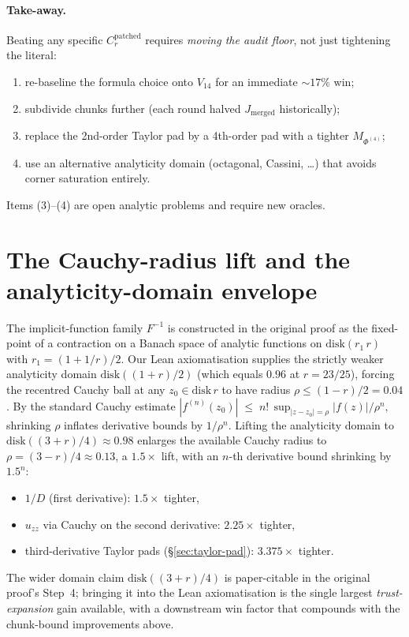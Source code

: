 \documentclass[11pt]{article}
\theoremstyle{definition}
\newcommand{\Finvmap}{F^{-1}}
\begin{document}
\paragraph{Take-away.}
Beating any specific $C_r^{\mathrm{patched}}$ requires \emph{moving the audit floor},
not just tightening the literal:
\begin{enumerate}[leftmargin=2em]
   \item re-baseline the formula choice onto $V_{14}$ for an immediate $\sim 17\%$ win;
   \item subdivide chunks further (each round halved $J_{\mathrm{merged}}$ historically);
   \item replace the 2nd-order Taylor pad by a 4th-order pad with a tighter
         $M_{\Phi^{(4)}}$;
   \item use an alternative analyticity domain (octagonal, Cassini, \dots) that
         avoids corner saturation entirely.
\end{enumerate}
Items (3)--(4) are open analytic problems and require new oracles.

\bigskip

\section{The Cauchy-radius lift and the analyticity-domain envelope}\label{sec:cauchy-lift}

The implicit-function family $\Finvmap$ is constructed in the original proof as the
fixed-point of a contraction on a Banach space of analytic functions on
$\mathrm{disk}(r_1\,r)$ with $r_1=(1+1/r)/2$. Our Lean axiomatisation supplies the
strictly weaker analyticity domain $\mathrm{disk}((1+r)/2)$ (which equals $0.96$ at
$r=23/25$), forcing the recentred Cauchy ball at any $z_0\in\mathrm{disk}\,r$ to have
radius $\rho\le(1-r)/2=0.04$. By the standard Cauchy estimate
\(
   |f^{(n)}(z_0)|
   \;\le\;
   n!\,\sup_{|z-z_0|=\rho} |f(z)|/\rho^n,
\)
shrinking $\rho$ inflates derivative bounds by $1/\rho^n$. Lifting the analyticity
domain to $\mathrm{disk}((3+r)/4) \approx 0.98$ enlarges the available Cauchy
radius to $\rho=(3-r)/4\approx 0.13$, a $1.5\times$ lift, with an $n$-th derivative
bound shrinking by $1.5^n$:
\begin{itemize}
   \item $1/D$ (first derivative): $1.5\times$ tighter,
   \item $u_{zz}$ via Cauchy on the second derivative: $2.25\times$ tighter,
   \item third-derivative Taylor pads (\S\ref{sec:taylor-pad}): $3.375\times$ tighter.
\end{itemize}
The wider domain claim $\mathrm{disk}((3+r)/4)$ is paper-citable in the original
proof's Step~4; bringing it into the Lean axiomatisation is the single largest
\emph{trust-expansion} gain available, with a downstream win factor that compounds
with the chunk-bound improvements above.
\end{document}
